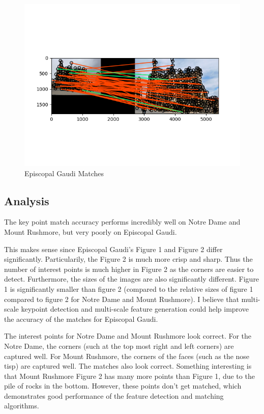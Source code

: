 \documentclass{article}
\begin{document}
\begin{figure}[H]
    \centering
    \includegraphics[width=\textwidth]{images/episcopal_gaudi_matches.png} %
    \caption{Episcopal Gaudi Matches}
    \label{fig:e_gaudi_match}
\end{figure}

\subsection{Analysis}
The key point match accuracy performs incredibly well on Notre Dame and Mount Rushmore, but very poorly on Episcopal Gaudi.

This makes sense since Episcopal Gaudi's Figure 1 and Figure 2 differ significantly. Particularily, the Figure 2 is much more crisp and sharp. Thus the number of interest points is much higher in Figure 2 as the corners are easier to detect. Furthermore, the sizes of the images are also significantly different. Figure 1 is significantly smaller than figure 2 (compared to the relative sizes of figure 1 compared to figure 2 for Notre Dame and Mount Rushmore). I believe that multi-scale keypoint detection and multi-scale feature generation could help improve the accuracy of the matches for Episcopal Gaudi.

The interest points for Notre Dame and Mount Rushmore look correct. For the Notre Dame, the corners (such at the top most right and left corners) are captured well. For Mount Rushmore, the corners of the faces (such as the nose tisp) are captured well. The matches also look correct. Something interesting is that Mount Rushmore Figure 2 has many more points than Figure 1, due to the pile of rocks in the bottom. However, these points don't get matched, which demonstrates good performance of the feature detection and matching algorithms.
\end{document}
